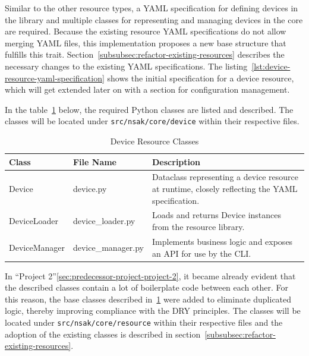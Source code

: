Similar to the other resource types, a \gls{YAML} specification for defining devices in the library and multiple classes for representing and managing devices in the core are required.
Because the existing resource \gls{YAML} specifications do not allow merging \gls{YAML} files,
this implementation proposes a new base structure that fulfills this trait.
Section~\ref{subsubsec:refactor-existing-resources} describes the necessary changes to the existing \gls{YAML} specifications.
The listing~\ref{lst:device-resource-yaml-specification} shows the initial specification for a device resource, which will get extended later on with a section for configuration management.


In the table~\ref{tab:device-resource-classes} below, the required Python classes are listed and described.
The classes will be located under \texttt{src/nsak/core/device} within their respective files.

\begin{table}[h]
    \centering
    \begin{tabularx}{\textwidth}{llX}
        \hline
        \textbf{Class} & \textbf{File Name} & \textbf{Description} \\
        \hline
        Device & device.py & Dataclass representing a device resource at runtime, closely reflecting the \gls{YAML} specification. \\
        DeviceLoader & device\_loader.py & Loads and returns Device instances from the resource library. \\
        DeviceManager & device\_manager.py & Implements business logic and exposes an \gls{API} for use by the \gls{CLI}. \\
        \hline
    \end{tabularx}
    \caption{Device Resource Classes}
    \label{tab:device-resource-classes}
\end{table}

In \enquote{Project 2}\ref{sec:predecessor-project-project-2}, it became already evident that the described classes contain a lot of boilerplate code between each other.
For this reason, the base classes described in~\ref{tab:device-resource-classes} were added to eliminate duplicated logic, thereby improving compliance with the \gls{DRY} principles.
The classes will be located under \texttt{src/nsak/core/resource} within their respective files and the adoption of the existing classes is described in section~\ref{subsubsec:refactor-existing-resources}.


